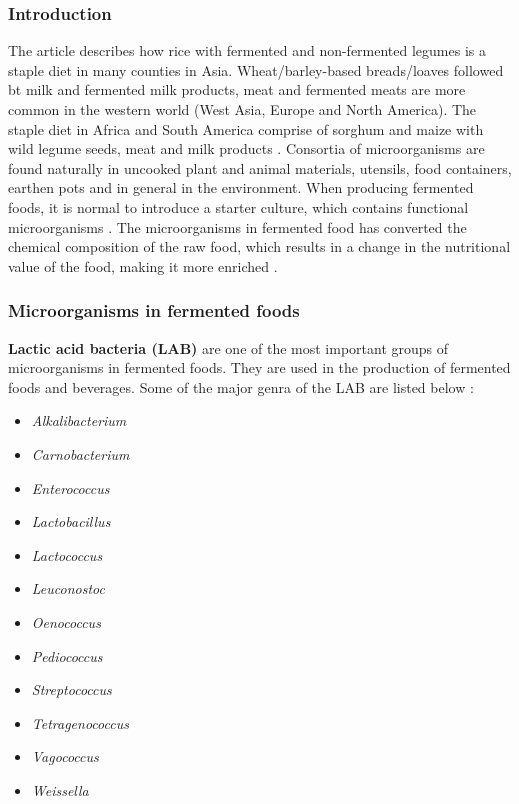 \subsubsection*{Introduction}
The article describes how rice with fermented and non-fermented legumes is a staple diet in many counties in Asia. Wheat/barley-based breads/loaves followed bt milk and fermented milk products, meat and fermented meats are more common in the western world (West Asia, Europe and North America). The staple diet in Africa and South America comprise of sorghum and maize with wild legume seeds, meat and milk products \cite*{L1-DiversityMicro}. 
Consortia of microorganisms are found naturally in uncooked plant and animal materials, utensils, food containers, earthen pots and in general in the environment. When producing fermented foods, it is normal to introduce a starter culture, which contains functional microorganisms \cite*{L1-DiversityMicro}. The microorganisms in fermented food has converted the chemical composition of the raw food, which results in a change in the nutritional value of the food, making it more enriched \cite*{L1-DiversityMicro}.

\subsubsection*{Microorganisms in fermented foods}

\textbf{Lactic acid bacteria (LAB)} are one of the most important groups of microorganisms in fermented foods. They are used in the production of fermented foods and beverages. Some of the major genra of the LAB are listed below \cite*{L1-DiversityMicro}:
\begin{highlight}
    \begin{multicols}{3}
        \begin{itemize}
            \item \textit{Alkalibacterium}
            \item \textit{Carnobacterium}
            \item \textit{Enterococcus}
            \item \textit{Lactobacillus}
            \item \textit{Lactococcus}
            \item \textit{Leuconostoc}
            \item \textit{Oenococcus}
            \item \textit{Pediococcus}
            \item \textit{Streptococcus}
            \item \textit{Tetragenococcus}
            \item \textit{Vagococcus}
            \item \textit{Weissella}
        \end{itemize}
    \end{multicols}
\end{highlight}

